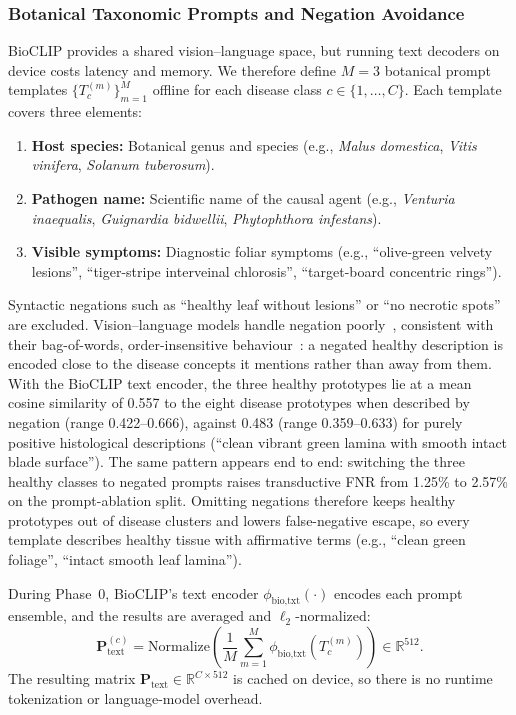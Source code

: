 \documentclass[preprint,12pt]{elsarticle}
\begin{document}
\subsubsection{Botanical Taxonomic Prompts and Negation Avoidance}
BioCLIP provides a shared vision--language space, but running text decoders on device costs latency and memory. We therefore define $M = 3$ botanical prompt templates $\{T_c^{(m)}\}_{m=1}^M$ offline for each disease class $c \in \{1, \dots, C\}$. Each template covers three elements:
\begin{enumerate}
    \item \textbf{Host species:} Botanical genus and species (e.g., \textit{Malus domestica}, \textit{Vitis vinifera}, \textit{Solanum tuberosum}).
    \item \textbf{Pathogen name:} Scientific name of the causal agent (e.g., \textit{Venturia inaequalis}, \textit{Guignardia bidwellii}, \textit{Phytophthora infestans}).
    \item \textbf{Visible symptoms:} Diagnostic foliar symptoms (e.g., ``olive-green velvety lesions'', ``tiger-stripe interveinal chlorosis'', ``target-board concentric rings'').
\end{enumerate}
Syntactic negations such as ``healthy leaf without lesions'' or ``no necrotic spots'' are excluded. Vision--language models handle negation poorly~\cite{alhamoud2025vision}, consistent with their bag-of-words, order-insensitive behaviour~\cite{yuksekgonul2023when}: a negated healthy description is encoded close to the disease concepts it mentions rather than away from them. With the BioCLIP text encoder, the three healthy prototypes lie at a mean cosine similarity of 0.557 to the eight disease prototypes when described by negation (range 0.422--0.666), against 0.483 (range 0.359--0.633) for purely positive histological descriptions (``clean vibrant green lamina with smooth intact blade surface''). The same pattern appears end to end: switching the three healthy classes to negated prompts raises transductive FNR from 1.25\% to 2.57\% on the prompt-ablation split. Omitting negations therefore keeps healthy prototypes out of disease clusters and lowers false-negative escape, so every template describes healthy tissue with affirmative terms (e.g., ``clean green foliage'', ``intact smooth leaf lamina'').

During Phase~0, BioCLIP's text encoder $\phi_{\text{bio,txt}}(\cdot)$ encodes each prompt ensemble, and the results are averaged and $\ell_2$-normalized:
\begin{equation}
    \mathbf{P}_{\text{text}}^{(c)} = \text{Normalize}\left(\frac{1}{M}\sum_{m=1}^M \phi_{\text{bio,txt}}(T_c^{(m)})\right) \in \mathbb{R}^{512}.
\end{equation}
The resulting matrix $\mathbf{P}_{\text{text}} \in \mathbb{R}^{C \times 512}$ is cached on device, so there is no runtime tokenization or language-model overhead.
\end{document}
